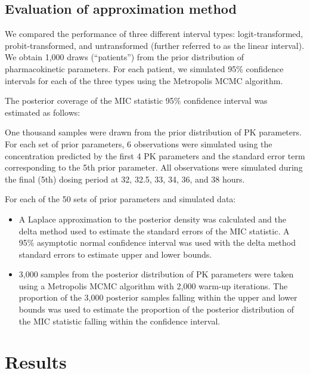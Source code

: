 \documentclass{article}\usepackage[]{graphicx}\usepackage[]{color}
\begin{document}
\subsection{Evaluation of approximation method}

	We compared the performance of three different interval types: logit-transformed, probit-transformed, and untransformed (further referred to as the linear interval). We obtain 1,000 draws (``patients'') from the prior distribution of pharmacokinetic parameters. For each patient, we simulated 95\% confidence intervals for each of the three types using the Metropolis MCMC algorithm.

The posterior coverage of the MIC statistic 95\% confidence interval was estimated as follows:

One thousand samples were drawn from the prior distribution of PK parameters. For each set of prior parameters, 6 observations were simulated using the concentration predicted by the first 4 PK parameters and the standard error term corresponding to the 5th prior parameter. All observations were simulated during the final (5th) dosing period at 32, 32.5, 33, 34, 36, and 38 hours.

For each of the 50 sets of prior parameters and simulated data:

\begin{itemize}
	 \item A Laplace approximation to the posterior density was calculated and the delta method used to estimate the standard errors of the MIC statistic. A 95\% asymptotic normal confidence interval was used with the delta method standard errors to estimate upper and lower bounds.
	 \item 3,000 samples from the posterior distribution of PK parameters were taken using a Metropolis MCMC algorithm with 2,000 warm-up iterations. The proportion of the 3,000 posterior samples falling within the upper and lower bounds was used to estimate the proportion of the posterior distribution of the MIC statistic falling within the confidence interval.
\end{itemize}

\section{Results}
\end{document}
